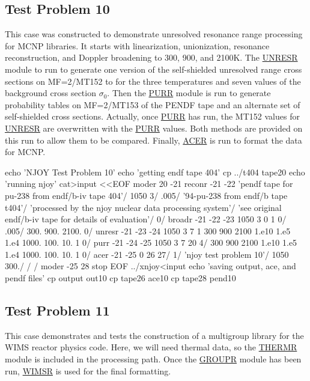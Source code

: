 \subsection{Test Problem 10}
\label{ssMandT_10}

This case was constructed to demonstrate unresolved resonance range
processing for MCNP libraries.  It starts with linearization,
unionization, resonance reconstruction, and Doppler broadening
to 300, 900, and 2100K.  The \hyperlink{sUNRESRhy}{UNRESR}
module to run to generate one version of the self-shielded
unresolved range cross sections on MF=2/MT152 to 
for the three temperatures and seven values of the background
cross section $\sigma_0$.  Then the \hyperlink{sPURRhy}{PURR}
module is run to generate probability tables on MF=2/MT153 of the
PENDF tape and an alternate set of self-shielded cross
sections.  Actually, once \hyperlink{sPURRhy}{PURR} has run, the
MT152 values for \hyperlink{sUNRESRhy}{UNRESR} are overwritten
with the \hyperlink{sPURRhy}{PURR} values.  Both methods are
provided on this run to allow them to be compared.  Finally,
\hyperlink{sACERhy}{ACER} is run to format the data for MCNP.

\small
\begin{ccode}

echo 'NJOY Test Problem 10'
echo 'getting endf tape 404'
cp ../t404 tape20
echo 'running njoy'
cat>input <<EOF
 moder
 20 -21
 reconr
 -21 -22
 'pendf tape for pu-238 from endf/b-iv tape 404'/
 1050 3/
 .005/
 '94-pu-238 from endf/b tape t404'/
 'processed by the njoy nuclear data processing system'/
 'see original endf/b-iv tape for details of evaluation'/
 0/
 broadr
 -21 -22 -23
 1050 3 0 1 0/
 .005/
 300. 900. 2100.
 0/
 unresr
 -21 -23 -24
 1050 3 7 1
 300 900 2100
 1.e10 1.e5 1.e4 1000. 100. 10. 1
 0/
 purr
 -21 -24 -25
 1050 3 7 20 4/
 300 900 2100
 1.e10 1.e5 1.e4 1000. 100. 10. 1
 0/
 acer
 -21 -25 0 26 27/
 1/
 'njoy test problem 10'/
 1050 300./
 /
 /
 moder
 -25 28
 stop
EOF
../xnjoy<input
echo 'saving output, ace, and pendf files'
cp output out10
cp tape26 ace10
cp tape28 pend10

\end{ccode}
\normalsize

\subsection{Test Problem 11}
\label{ssMandT_11}

This case demonstrates and tests the construction of a multigroup
library for the WIMS reactor physics code.  Here, we will need
thermal data, so the \hyperlink{sTHERMRhy}{THERMR} module
is included in the processing path.  Once the
\hyperlink{sGROUPRhy}{GROUPR} module has been run,
\hyperlink{sWIMSRhy}{WIMSR} is used for the final formatting.

